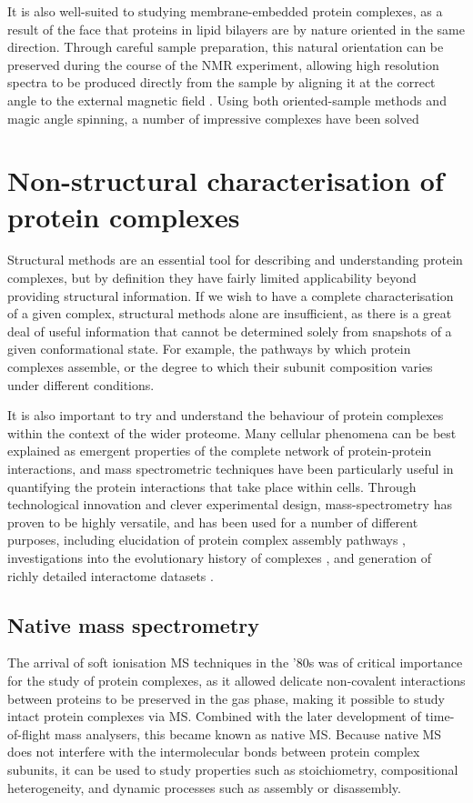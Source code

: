 \documentclass[a4paper,11pt,twoside,openright]{scrbook}
\begin{document}
It is also well-suited to studying membrane-embedded protein complexes, as a result of the face that proteins in lipid bilayers are by nature oriented in the same direction. Through careful sample preparation, this natural orientation can be preserved during the course of the NMR experiment, allowing high resolution spectra to be produced directly from the sample by aligning it at the correct angle to the external magnetic field \cite{Hansen2015}. Using both oriented-sample methods and magic angle spinning, a number of impressive complexes have been solved \cite{Loquet2012,Kaplan2015,Huang2017}

\section{Non-structural characterisation of protein complexes}
Structural methods are an essential tool for describing and understanding protein complexes, but by definition they have fairly limited applicability beyond providing structural information. If we wish to have a complete characterisation of a given complex, structural methods alone are insufficient, as there is a great deal of useful information that cannot be determined solely from snapshots of a given conformational state. For example, the pathways by which protein complexes assemble, or the degree to which their subunit composition varies under different conditions.

It is also important to try and understand the behaviour of protein complexes within the context of the wider proteome. Many cellular phenomena can be best explained as emergent properties of the complete network of protein-protein interactions, and mass spectrometric techniques have been particularly useful in quantifying the protein interactions that take place within cells. Through technological innovation and clever experimental design, mass-spectrometry has proven to be highly versatile, and has been used for a number of different purposes, including elucidation of protein complex assembly pathways \cite{Levy2008,Marsh2013}, investigations into the evolutionary history of complexes \cite{Wan2015}, and generation of richly detailed interactome datasets \cite{Hein2015}.

\subsection{Native mass spectrometry}
The arrival of soft ionisation MS techniques in the '80s was of critical importance for the study of protein complexes, as it allowed delicate non-covalent interactions between proteins to be preserved in the gas phase, making it possible to study intact protein complexes via MS. Combined with the later development of time-of-flight mass analysers, this became known as native MS. Because native MS does not interfere with the intermolecular bonds between protein complex subunits, it can be used to study properties such as stoichiometry, compositional heterogeneity, and dynamic processes such as assembly or disassembly.
\end{document}

